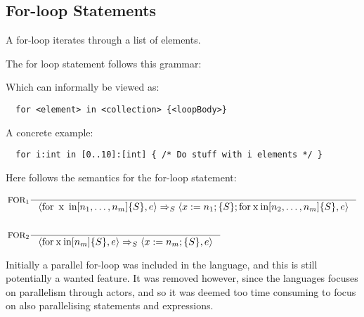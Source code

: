 \subsection{For-loop Statements}
\label{subsec:forLoopStatements}

A for-loop iterates through a list of elements.

The for loop statement follows this grammar:


Which can informally be viewed as:

\begin{verbatim}
  for <element> in <collection> {<loopBody>}
\end{verbatim}

A concrete example:

\begin{verbatim}
  for i:int in [0..10]:[int] { /* Do stuff with i elements */ }
\end{verbatim}

Here follows the semantics for the for-loop statement:

\begin{align*}
&\inference[$\text{FOR}_{1}$]{}
                       {\Braket{\Tfor \Tx \Tin [n_1,\dots,n_m]\{S\},e} \Rightarrow_S \Braket{x := n_1;\{S\}; \Tfor \mathbin{\text{x}} \mathbin{\text{in}} [n_2,\dots,n_m]\{S\},e}}
\\\\
&\inference[$\text{FOR}_{2}$]{}
                       {\Braket{\Tfor \mathbin{\text{x}}\mathbin{\text{in}} [n_m]\{S\},e} \Rightarrow_S \Braket{x := n_m;\{S\},e}}
\end{align*}

Initially a parallel for-loop was included in the language, and this is still potentially a wanted feature. It was removed however, since the languages focuses on parallelism through actors, and so it was deemed too time consuming to focus on also parallelising statements and expressions.